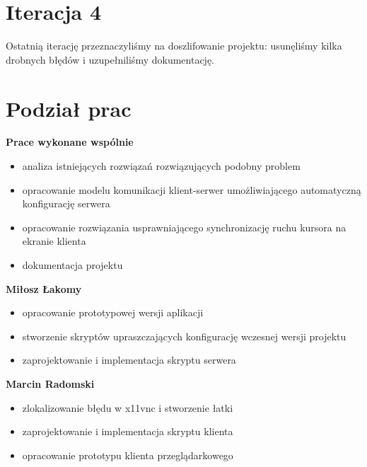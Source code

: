 \section{Iteracja 4}

  Ostatnią iterację przeznaczyliśmy na doszlifowanie projektu: usunęliśmy kilka drobnych błędów i uzupełniliśmy dokumentację.

\section{Podział prac}

  \textbf{Prace wykonane wspólnie}
  \begin{itemize}[noitemsep]
    \item analiza istniejących rozwiązań rozwiązujących podobny problem
    \item opracowanie modelu komunikacji klient-serwer umożliwiającego automatyczną konfigurację serwera
    \item opracowanie rozwiązania usprawniającego synchronizację ruchu kursora na ekranie klienta
    \item dokumentacja projektu
  \end{itemize}

  \noindent
  \textbf{Miłosz Łakomy}
  \begin{itemize}[noitemsep]
    \item opracowanie prototypowej wersji aplikacji
    \item stworzenie skryptów upraszczających konfigurację wczesnej wersji projektu
    \item zaprojektowanie i implementacja skryptu serwera
  \end{itemize}

  \noindent
  \textbf{Marcin Radomski}
  \begin{itemize}[noitemsep]
    \item zlokalizowanie błędu w x11vnc i stworzenie łatki
    \item zaprojektowanie i implementacja skryptu klienta
    \item opracowanie prototypu klienta przeglądarkowego
  \end{itemize}

  \vfill

 
